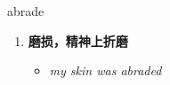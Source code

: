 
\begin{frame}
{\huge abrade}
\begin{center}
\begin{enumerate}\Large
  \item \textbf{磨损，精神上折磨}
  \begin{itemize}
    \item \em{\Large{my skin was abraded}}
  \end{itemize}
\end{enumerate}
\end{center}
\end{frame}
